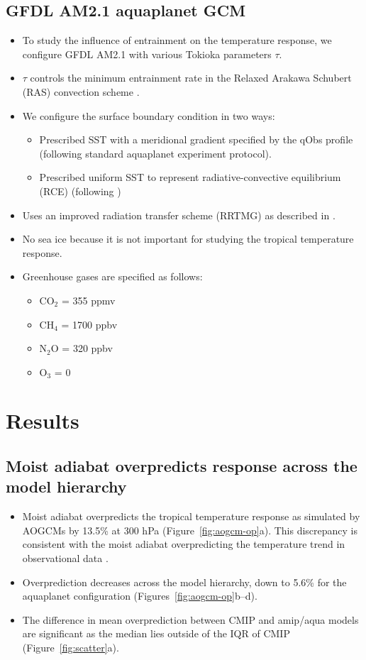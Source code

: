 \documentclass{ametsocV5}
\begin{document}
\subsection{GFDL AM2.1 aquaplanet GCM} \label{gfdl}
\begin{itemize}
\item To study the influence of entrainment on the temperature response, we configure GFDL AM2.1 with various Tokioka parameters $\tau$.
\item $\tau$ controls the minimum entrainment rate in the Relaxed Arakawa Schubert (RAS) convection scheme \citep{moorthi-suarez-1992, tokioka-et-al-1988}.
\item We configure the surface boundary condition in two ways:
\begin{itemize}
\item Prescribed SST with a meridional gradient specified by the qObs profile (following standard aquaplanet experiment protocol).
\item Prescribed uniform SST to represent radiative-convective equilibrium (RCE) (following \citet{wing-et-al-2018})
\end{itemize}
\item Uses an improved radiation transfer scheme (RRTMG) as described in \citet{tan-et-al-2019}.
\item No sea ice because it is not important for studying the tropical temperature response.
\item Greenhouse gases are specified as follows:
\begin{itemize}
\item CO$_2$ = 355 ppmv
\item CH$_4$ = 1700 ppbv
\item N$_2$O = 320 ppbv
\item O$_3$ = 0
\end{itemize}
\end{itemize}

\section{Results}

\subsection{Moist adiabat overpredicts response across the model hierarchy}

\begin{itemize}
\item Moist adiabat overpredicts the tropical temperature response as simulated by AOGCMs by 13.5\% at 300 hPa (Figure~\ref{fig:aogcm-op}a). This discrepancy is consistent with the moist adiabat overpredicting the temperature trend in observational data \citep{ogorman-singh-2013, flannaghan-et-al-2014}.
\item Overprediction decreases across the model hierarchy, down to 5.6\% for the aquaplanet configuration (Figures~\ref{fig:aogcm-op}b--d).
\item The difference in mean overprediction between CMIP and amip/aqua models are significant as the median lies outside of the IQR of CMIP (Figure~\ref{fig:scatter}a).
\end{itemize}
\end{document}
